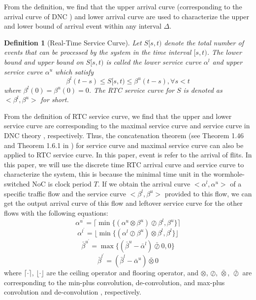 \documentclass[10pt,journal]{IEEEtran}
\newtheorem{definition}{Definition}
\begin{document}
From the definition, we find that the upper arrival curve (corresponding to the arrival curve of DNC \cite{Boudec2001Network}) and lower arrival curve are used to characterize the upper and lower bound of arrival event within any interval $\Delta$.

\begin{definition}[Real-Time Service Curve]
Let $S[s,t)$ denote the total number of events that can be processed by the system in the time interval $[s,t)$. The lower bound and upper bound on $S[s,t)$ is called the lower service curve $\alpha^l$ and upper service curve $\alpha^u$ which satisfy
$$\beta^l(t-s)\leq S[s,t)\leq \beta^u(t-s),\forall s<t$$
where $\beta^l(0)=\beta^u(0)=0$. The RTC service curve for $S$ is denoted as $<\beta^l,\beta^u>$ for short.
\end{definition}

From the definition of RTC service curve, we find that the upper and lower service curve are corresponding to the maximal service curve and service curve in DNC theory \cite{Boudec2001Network}, respectively. Thus, the concatenation theorem (see Theorem 1.46 and Theorem 1.6.1 in \cite{Boudec2001Network}) for service curve and maximal service curve can also be applied to RTC service curve. In this paper, event is refer to the arrival of flits. In this paper, we will use the discrete time RTC arrival curve and service curve to characterize the system, this is because the minimal time unit in the wormhole-switched NoC is clock period $T$. If we obtain the arrival curve $<\alpha^l,\alpha^u>$ of a specific traffic flow and the service curve $<\beta^l,\beta^u>$ provided to this flow, we can get the output arrival curve of this flow and leftover service curve for the other flows with the following equations:
\begin{equation}\label{alphau}
\alpha^{u^\prime}=\lceil\min\{(\alpha^u\otimes\beta^u)\oslash\beta^l,\beta^u\}\rceil
\end{equation}
\begin{equation}\label{alphal}
\alpha^{l^\prime}=\lfloor\min\{(\alpha^l\oslash\beta^u)\otimes\beta^l,\beta^l\}\rfloor
\end{equation}
\begin{equation}\label{betau}
\bar{\beta}^{u^\prime}=\max\{(\bar{\beta}^u-\bar{\alpha}^l)\bar{\oslash}0,0\}
\end{equation}
\begin{equation}\label{betal}
\bar{\beta}^{l^\prime}=(\bar{\beta}^l-\bar{\alpha}^u)\bar{\otimes}0
\end{equation}
where $\lceil\cdot\rceil$, $\lfloor\cdot\rfloor$ are the ceiling operator and flooring operator, and $\otimes$, $\oslash$, $\bar{\otimes}$, $\bar{\oslash}$ are corresponding to the min-plus convolution, de-convolution, and max-plus convolution and de-convolution \cite{Boudec2001Network}, respectively.
\end{document}
